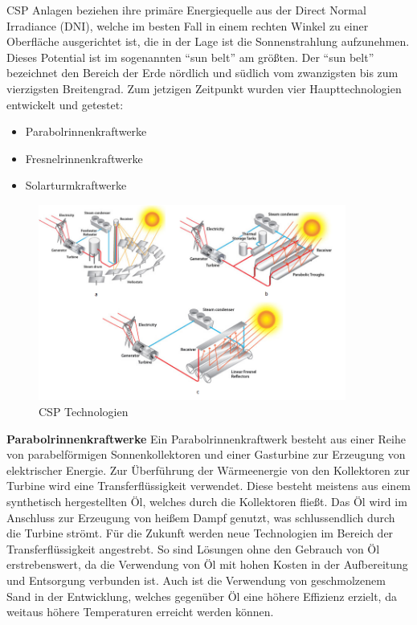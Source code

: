 CSP Anlagen beziehen ihre primäre Energiequelle aus der Direct Normal Irradiance (DNI), welche im besten Fall in einem rechten Winkel zu einer Oberfläche ausgerichtet ist, die in der Lage ist die Sonnenstrahlung aufzunehmen. Dieses Potential ist im sogenannten "`sun belt"' am größten. Der "`sun belt"' bezeichnet den Bereich der Erde nördlich und südlich vom zwanzigsten bis zum vierzigsten Breitengrad. Zum jetzigen Zeitpunkt wurden vier Haupttechnologien entwickelt und getestet:

\begin{itemize}
	\item Parabolrinnenkraftwerke
	\item Fresnelrinnenkraftwerke
	\item Solarturmkraftwerke
\end{itemize}

\begin{figure}[H]
	\centering
	\includegraphics[width=0.9\textwidth,trim=1 1 1 1,clip]{technik.png}
	\caption{CSP Technologien}
	\label{fig:technik}
\end{figure}

\textbf{Parabolrinnenkraftwerke}
\newline
Ein Parabolrinnenkraftwerk besteht aus einer Reihe von parabelförmigen Sonnenkollektoren und einer Gasturbine zur Erzeugung von elektrischer Energie. Zur Überführung der Wärmeenergie von den Kollektoren zur Turbine wird eine Transferflüssigkeit verwendet. Diese besteht meistens aus einem synthetisch hergestellten Öl, welches durch die Kollektoren fließt. Das Öl wird im Anschluss zur Erzeugung von heißem Dampf genutzt, was schlussendlich durch die Turbine strömt. Für die Zukunft werden neue Technologien im Bereich der Transferflüssigkeit angestrebt. So sind Lösungen ohne den Gebrauch von Öl erstrebenswert, da die Verwendung von Öl mit hohen Kosten in der Aufbereitung und Entsorgung verbunden ist. Auch ist die Verwendung von geschmolzenem Sand in der Entwicklung, welches gegenüber Öl eine höhere Effizienz erzielt, da weitaus höhere Temperaturen erreicht werden können.

